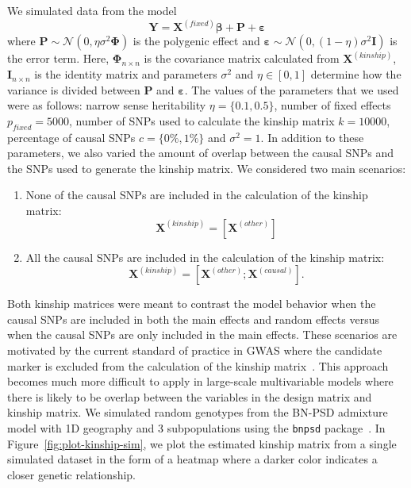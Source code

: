 \documentclass[12pt,letter]{article}\usepackage[]{graphicx}\usepackage[]{color}
\newcommand{\bX}{\textbf{X}}
\newcommand{\bY}{\textbf{Y}}
\newcommand{\bI}{\textbf{I}}
\newcommand{\be}{\boldsymbol{\varepsilon}}
\newcommand{\bbeta}{\boldsymbol{\beta}}
\newcommand{\bPhi}{\boldsymbol{\Phi}}
\begin{document}
We simulated data from the model
\begin{equation}
\bY = \bX^{(fixed)} \bbeta + \mathbf{P} + \be
\end{equation}
where $\mathbf{P}\sim \mathcal{N}(0, \eta \sigma^2 \bPhi)$ is the polygenic effect and $\be \sim \mathcal{N}(0, (1-\eta) \sigma^2 \bI)$ is the error term. Here, $\bPhi_{n \times n}$ is the covariance matrix calculated from $\bX^{(kinship)}$, $\bI_{n \times n}$ is the identity matrix and parameters $\sigma^2$ and $\eta \in [0,1]$ determine how the variance is divided between $\mathbf{P}$ and $\be$. The values of the parameters that we used were as follows: narrow sense heritability $\eta=\lbrace 0.1, 0.5 \rbrace$, number of fixed effects $p_{fixed} = 5000$, number of SNPs used to calculate the kinship matrix $k = 10000$, percentage of causal SNPs $c=\lbrace 0\%, 1\%\rbrace$ and $\sigma^2 = 1$. In addition to these parameters, we also varied the amount of overlap between the causal SNPs and the SNPs used to generate the kinship matrix. We considered two main scenarios:

\begin{enumerate}
	\item None of the causal SNPs are included in the calculation of the kinship matrix: $$\bX^{(kinship)} = \left[\bX^{(other)} \right]$$
	\item All the causal SNPs are included in the calculation of the kinship matrix: $$\bX^{(kinship)} = \left[\bX^{(other)} ; \bX^{(causal)}\right].$$
\end{enumerate}

Both kinship matrices were meant to contrast the model behavior when the causal SNPs are included in both the main effects and random effects versus when the causal SNPs are only included in the main effects. These scenarios are motivated by the current standard of practice in GWAS where the candidate marker is excluded from the calculation of the kinship matrix~\citep{lippert2011fast}. This approach becomes much more difficult to apply in large-scale multivariable models where there is likely to be overlap between the variables in the design matrix and kinship matrix. We simulated random genotypes from the BN-PSD admixture model with 1D geography and 3 subpopulations using the \texttt{bnpsd} package~\citep{bnpsd1,bnpsd2}. In Figure~\ref{fig:plot-kinship-sim}, we plot the estimated kinship matrix from a single simulated dataset in the form of a heatmap where a darker color indicates a closer genetic relationship. 
\end{document}

